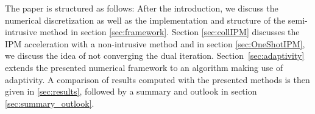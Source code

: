 The paper is structured as follows: After the introduction, we discuss the numerical discretization as well as the implementation and structure of the semi-intrusive method in section \ref{sec:framework}. Section \ref{sec:collIPM} discusses the IPM acceleration with a non-intrusive method and in section \ref{sec:OneShotIPM}, we discuss the idea of not converging the dual iteration. Section~\ref{sec:adaptivity} extends the presented numerical framework to an algorithm making use of adaptivity. A comparison of results computed with the presented methods is then given in \ref{sec:results}, followed by a summary and outlook in section \ref{sec:summary_outlook}.

